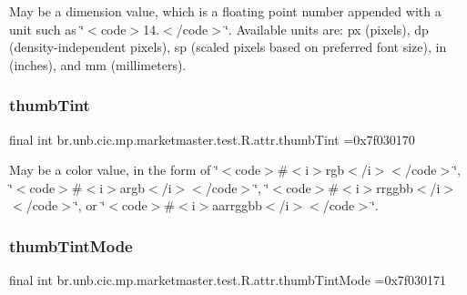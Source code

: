 May be a dimension value, which is a floating point number appended with a unit such as \char`\"{}$<$code$>$14.\+5sp$<$/code$>$\char`\"{}. Available units are\+: px (pixels), dp (density-\/independent pixels), sp (scaled pixels based on preferred font size), in (inches), and mm (millimeters). \mbox{\label{classbr_1_1unb_1_1cic_1_1mp_1_1marketmaster_1_1test_1_1R_1_1attr_a4d5f8734bb460822149c06925ef47433}} 
\subsubsection{\texorpdfstring{thumb\+Tint}{thumbTint}}
{\footnotesize\ttfamily final int br.\+unb.\+cic.\+mp.\+marketmaster.\+test.\+R.\+attr.\+thumb\+Tint =0x7f030170\hspace{0.3cm}{\ttfamily [static]}}

May be a color value, in the form of \char`\"{}$<$code$>$\#$<$i$>$rgb$<$/i$>$$<$/code$>$\char`\"{}, \char`\"{}$<$code$>$\#$<$i$>$argb$<$/i$>$$<$/code$>$\char`\"{}, \char`\"{}$<$code$>$\#$<$i$>$rrggbb$<$/i$>$$<$/code$>$\char`\"{}, or \char`\"{}$<$code$>$\#$<$i$>$aarrggbb$<$/i$>$$<$/code$>$\char`\"{}. \mbox{\label{classbr_1_1unb_1_1cic_1_1mp_1_1marketmaster_1_1test_1_1R_1_1attr_a915085202d245ae236b234e6a9ac93db}} 
\subsubsection{\texorpdfstring{thumb\+Tint\+Mode}{thumbTintMode}}
{\footnotesize\ttfamily final int br.\+unb.\+cic.\+mp.\+marketmaster.\+test.\+R.\+attr.\+thumb\+Tint\+Mode =0x7f030171\hspace{0.3cm}{\ttfamily [static]}}

